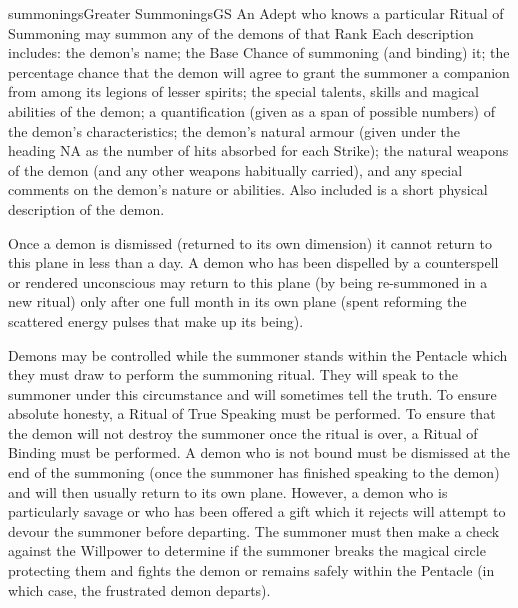 \begin{College}[1.0]{summonings}{Greater Summonings}{GS}
An Adept who knows a particular Ritual of Summoning may summon any of
the demons of that Rank Each description includes: the demon’s name;
the Base Chance of summoning (and binding) it; the percentage chance
that the demon will agree to grant the summoner a companion from among
its legions of lesser spirits; the special talents, skills and magical
abilities of the demon; a quantification (given as a span of possible
numbers) of the demon’s characteristics; the demon’s natural armour
(given under the heading NA as the number of hits absorbed for each
Strike); the natural weapons of the demon (and any other weapons
habitually carried), and any special comments on the demon’s nature or
abilities.  Also included is a short physical description of the
demon.

Once a demon is dismissed (returned to its own dimension) it cannot
return to this plane in less than a day.  A demon who has been
dispelled by a counterspell or rendered unconscious may return to this
plane (by being re-summoned in a new ritual) only after one full month
in its own plane (spent reforming the scattered energy pulses that
make up its being).

Demons may be controlled while the summoner stands within the Pentacle
which they must draw to perform the summoning ritual.  They will speak
to the summoner under this circumstance and will sometimes tell the
truth.  To ensure absolute honesty, a Ritual of True Speaking must be
performed.  To ensure that the demon will not destroy the summoner
once the ritual is over, a Ritual of Binding must be performed. A
demon who is not bound must be dismissed at the end of the summoning
(once the summoner has finished speaking to the demon) and will then
usually return to its own plane.  However, a demon who is particularly
savage or who has been offered a gift which it rejects will attempt to
devour the summoner before departing.  The summoner must then make a
check against the Willpower to determine if the summoner breaks the
magical circle protecting them and fights the demon or remains safely
within the Pentacle (in which case, the frustrated demon departs).


\end{College}
